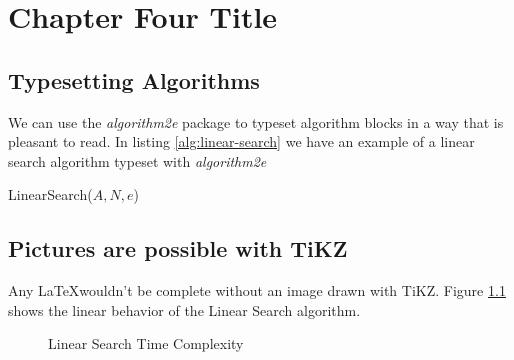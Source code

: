 \chapter{Chapter Four Title}

\section{Typesetting Algorithms}

We can use the \emph{algorithm2e} package to typeset algorithm blocks in a way
that is pleasant to read. In listing \ref{alg:linear-search} we have an example
of a linear search algorithm typeset with \emph{algorithm2e}

\begin{function}[H]
  \caption{LinearSearch($A,N,e$)}
  \label{alg:linear-search}
\end{function}

\section{Pictures are possible with TiKZ}

Any \LaTeX wouldn't be complete without an image drawn with TiKZ. Figure
\ref{fig:linear-search} shows the linear behavior of the Linear Search
algorithm.

\begin{figure}[h]
  \centering
  \caption{Linear Search Time Complexity}
  \label{fig:linear-search}
\end{figure}


